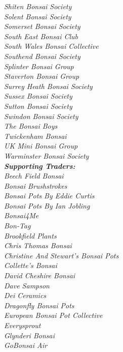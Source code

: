 \begin{itemize}
    \emph{Shiten Bonsai Society} \\
    \emph{Solent Bonsai Society} \\
    \emph{Somerset Bonsai Society} \\
    \emph{South East Bonsai Club} \\
    \emph{South Wales Bonsai Collective} \\
    \emph{Southend Bonsai Society} \\
    \emph{Splinter Bonsai Group} \\
    \emph{Staverton Bonsai Group} \\
    \emph{Surrey Heath Bonsai Society} \\
    \emph{Sussex Bonsai Society} \\
    \emph{Sutton Bonsai Society} \\
    \emph{Swindon Bonsai Society} \\
    \emph{The Bonsai Boys} \\
    \emph{Twickenham Bonsai} \\
    \emph{UK Mini Bonsai Group} \\
    \emph{Warminster Bonsai Society} \\
    \emph{\textbf{Supporting Traders:}} \\
    \emph{Beech Field Bonsai} \\
    \emph{Bonsai Brushstrokes} \\
    \emph{Bonsai Pots By Eddie Curtis} \\
    \emph{Bonsai Pots By Ian Jobling} \\
    \emph{Bonsai4Me} \\
    \emph{Bon-Tag} \\
    \emph{Brookfield Plants} \\
    \emph{Chris Thomas Bonsai} \\
    \emph{Christine And Stewart's Bonsai Pots} \\
    \emph{Collette's Bonsai} \\
    \emph{David Cheshire Bonsai} \\
    \emph{Dave Sampson} \\
    \emph{Dei Ceramics} \\
    \emph{Dragonfly Bonsai Pots} \\
    \emph{European Bonsai Pot Collective} \\
    \emph{Everysprout} \\
    \emph{Glynderi Bonsai} \\
    \emph{GoBonsai Air} \\

\end{itemize}
